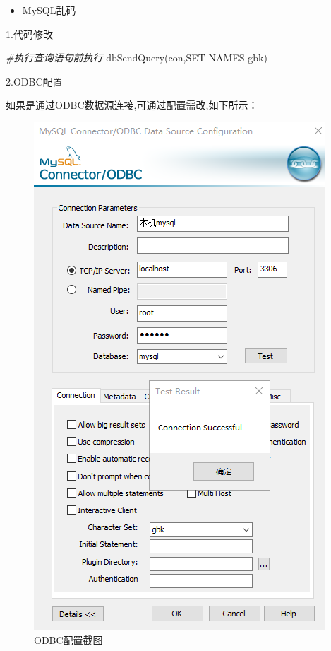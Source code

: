 \documentclass[
]{book}
\newenvironment{Shaded}{\begin{snugshade}}{\end{snugshade}}
\newcommand{\CommentTok}[1]{\textcolor[rgb]{0.56,0.35,0.01}{\textit{#1}}}
\newcommand{\FunctionTok}[1]{\textcolor[rgb]{0.00,0.00,0.00}{#1}}
\newcommand{\NormalTok}[1]{#1}
\newcommand{\StringTok}[1]{\textcolor[rgb]{0.31,0.60,0.02}{#1}}
\providecommand{\tightlist}{%
  \setlength{\itemsep}{0pt}\setlength{\parskip}{0pt}}
\begin{document}
\begin{itemize}
\tightlist
\item
  MySQL乱码
\end{itemize}

1.代码修改

\begin{Shaded}
\begin{Highlighting}[]
\CommentTok{\#执行查询语句前执行}
\FunctionTok{dbSendQuery}\NormalTok{(con,}\StringTok{\textquotesingle{}SET NAMES gbk\textquotesingle{}}\NormalTok{)}
\end{Highlighting}
\end{Shaded}

2.ODBC配置

如果是通过ODBC数据源连接,可通过配置需改,如下所示：

\begin{figure}
\centering
\includegraphics{./picture/chap2/pic1.png}
\caption{ODBC配置截图}
\end{figure}
\end{document}
